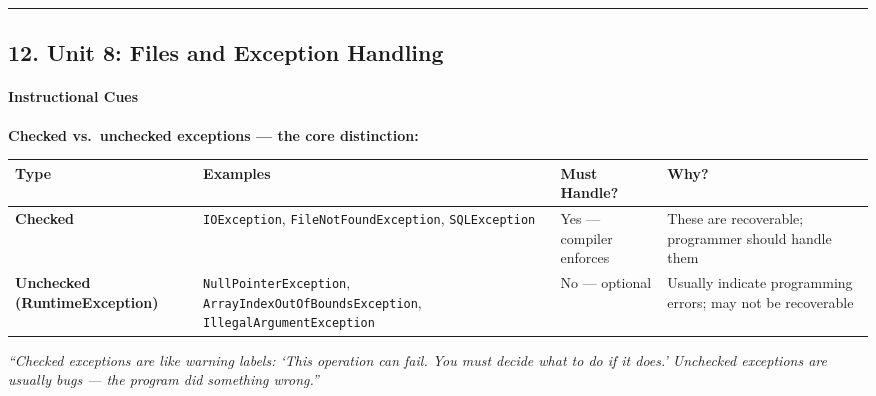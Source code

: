 \documentclass[
  justified,
  openright,
]{tufte-book}
\let\paragraph\paragraph
\let\paragraph\paragraph
\begin{document}
\begin{center}\rule{0.5\linewidth}{0.5pt}\end{center}

\subsection{12. Unit 8: Files and Exception
Handling}\label{unit-8-files-and-exception-handling}

\paragraph{Instructional Cues}\label{instructional-cues-9}

\textbf{Checked vs.~unchecked exceptions --- the core distinction:}

{\def\LTcaptype{none} %
\begin{longtable}[]{@{}
  >{\raggedright\arraybackslash}p{}
  >{\raggedright\arraybackslash}p{}
  >{\raggedright\arraybackslash}p{}
  >{\raggedright\arraybackslash}p{}@{}}
\toprule\noalign{}
\begin{minipage}[b]{\linewidth}\raggedright
Type
\end{minipage} & \begin{minipage}[b]{\linewidth}\raggedright
Examples
\end{minipage} & \begin{minipage}[b]{\linewidth}\raggedright
Must Handle?
\end{minipage} & \begin{minipage}[b]{\linewidth}\raggedright
Why?
\end{minipage} \\
\midrule\noalign{}
\endhead
\bottomrule\noalign{}
\endlastfoot
\textbf{Checked} & \texttt{IOException}, \texttt{FileNotFoundException},
\texttt{SQLException} & Yes --- compiler enforces & These are
recoverable; programmer should handle them \\
\textbf{Unchecked (RuntimeException)} & \texttt{NullPointerException},
\texttt{ArrayIndexOutOfBoundsException},
\texttt{IllegalArgumentException} & No --- optional & Usually indicate
programming errors; may not be recoverable \\
\end{longtable}
}

\emph{``Checked exceptions are like warning labels: `This operation can
fail. You must decide what to do if it does.' Unchecked exceptions are
usually bugs --- the program did something wrong.''}
\end{document}
